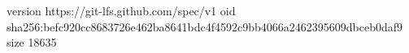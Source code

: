 version https://git-lfs.github.com/spec/v1
oid sha256:befc920cc8683726e462ba8641bdc4f4592c9bb4066a2462395609dbceb0daf9
size 18635
